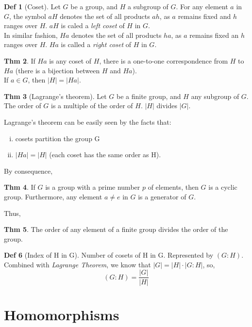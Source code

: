 \documentclass{article}
\theoremstyle{definition}
\newtheorem{definition}{Def}[section]
\newtheorem{theorem}[definition]{Thm}
\begin{document}
\begin{definition}[Coset]
    Let $G$ be a group, and $H$ a subgroup of $G$. For any element $a$ in $G$, the symbol $aH$ denotes the set of all products $ah$, as $a$ remains fixed and $h$ ranges over $H$. $aH$ is caled a \emph{left coset} of $H$ in $G$.
    \\
    In similar fashion, $Ha$ denotes the set of all products $ha$, as $a$ remains fixed an $h$ ranges over $H$. $Ha$ is called a \emph{right coset} of $H$ in $G$.
\end{definition}

\begin{theorem}
    If $Ha$ is any coset of $H$, there is a one-to-one correspondence from $H$ to $Ha$ (there is a bijection between $H$ and $Ha$).\\
    If $a \in G$, then $|H| = |Ha|$.
\end{theorem}

\begin{theorem}[Lagrange's theorem]
    Let $G$ be a finite group, and $H$ any subgroup of $G$. The order of $G$ is a multiple of the order of $H$. $|H|$ divides $|G|$.
\end{theorem}
    Lagrange's theorem can be easily seen by the facts that:
    \begin{enumerate}[i.]
	\item cosets partition the group G
	\item $|Ha| = |H|$ (each coset has the same order as H). 
    \end{enumerate}

By consequence,
\begin{theorem}
    If $G$ is a group with a prime number $p$ of elements, then $G$ is a cyclic group. Furthermore, any element $a \neq e$ in $G$ is a generator of $G$.
\end{theorem}

Thus,
\begin{theorem}
    The order of any element of a finite group divides the order of the group.
\end{theorem}

\begin{definition}[Index of H in G]
    Number of cosets of H in G. Represented by $(G:H)$.\\
    Combined with \emph{Lagrange Theorem}, we know that $|G| = |H| \cdot |G:H|$, so,
    $$(G:H) = \frac{|G|}{|H|}$$
\end{definition}


\section{Homomorphisms}
\end{document}
